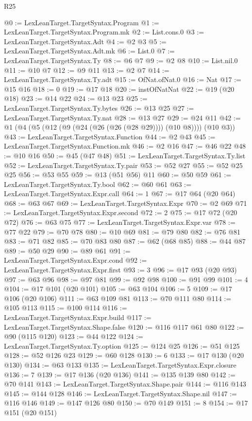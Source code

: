 \begin{lexlean}{R25}
\begin{coremodule}
@0 := LexLeanTarget.TargetSyntax.Program
@1 := LexLeanTarget.TargetSyntax.Program.mk
@2 := List.cons.{0}
@3 := LexLeanTarget.TargetSyntax.Adt
@4 := @2 @3
@5 := LexLeanTarget.TargetSyntax.Adt.mk
@6 := List.{0}
@7 := LexLeanTarget.TargetSyntax.Ty
@8 := @6 @7
@9 := @2 @8
@10 := List.nil.{0}
@11 := @10 @7
@12 := @9 @11
@13 := @2 @7
@14 := LexLeanTarget.TargetSyntax.Ty.adt
@15 := OfNat.ofNat.{0}
@16 := Nat
@17 := @15 @16
@18 := 0
@19 := @17 @18
@20 := instOfNatNat
@22 := @19 (@20 @18)
@23 := @14 @22
@24 := @13 @23
@25 := LexLeanTarget.TargetSyntax.Ty.bytes
@26 := @13 @25
@27 := LexLeanTarget.TargetSyntax.Ty.nat
@28 := @13 @27
@29 := @24 @11
@42 := @1 (@4 (@5 (@12 (@9 (@24 (@26 (@26 (@28 @29)))) (@10 @8)))) (@10 @3))
@43 := LexLeanTarget.TargetSyntax.Function
@44 := @2 @43
@45 := LexLeanTarget.TargetSyntax.Function.mk
@46 := @2 @16
@47 := @46 @22
@48 := @10 @16
@50 := @45 (@47 @48)
@51 := LexLeanTarget.TargetSyntax.Ty.list
@52 := LexLeanTarget.TargetSyntax.Ty.pair
@53 := @52 @27
@55 := @52 @25 @25
@56 := @53 @55
@59 := @13 (@51 @56) @11
@60 := @50 @59
@61 := LexLeanTarget.TargetSyntax.Ty.bool
@62 := @60 @61
@63 := LexLeanTarget.TargetSyntax.Expr.call
@64 := 1
@67 := @17 @64 (@20 @64)
@68 := @63 @67
@69 := LexLeanTarget.TargetSyntax.Expr
@70 := @2 @69
@71 := LexLeanTarget.TargetSyntax.Expr.second
@72 := 2
@75 := @17 @72 (@20 @72)
@76 := @63 @75
@77 := LexLeanTarget.TargetSyntax.Expr.var
@78 := @77 @22
@79 := @70 @78
@80 := @10 @69
@81 := @79 @80
@82 := @76 @81
@83 := @71 @82
@85 := @70 @83 @80
@87 := @62 (@68 @85)
@88 := @44 @87
@89 := @50 @29
@90 := @89 @61
@91 := LexLeanTarget.TargetSyntax.Expr.cond
@92 := LexLeanTarget.TargetSyntax.Expr.first
@93 := 3
@96 := @17 @93 (@20 @93)
@97 := @63 @96
@98 := @97 @81
@99 := @92 @98
@100 := @91 @99
@101 := 4
@104 := @17 @101 (@20 @101)
@105 := @63 @104
@106 := 5
@109 := @17 @106 (@20 @106)
@111 := @63 @109 @81
@113 := @70 @111 @80
@114 := @105 @113
@115 := @100 @114
@116 := LexLeanTarget.TargetSyntax.Expr.build
@117 := LexLeanTarget.TargetSyntax.Shape.false
@120 := @116 @117 @61 @80
@122 := @90 (@115 @120)
@123 := @44 @122
@124 := LexLeanTarget.TargetSyntax.Ty.option
@125 := @124 @25
@126 := @51 @125
@128 := @52 @126 @23
@129 := @60 @128
@130 := 6
@133 := @17 @130 (@20 @130)
@134 := @63 @133
@135 := LexLeanTarget.TargetSyntax.Expr.closure
@136 := 7
@139 := @17 @136 (@20 @136)
@141 := @135 @139 @80
@142 := @70 @141
@143 := LexLeanTarget.TargetSyntax.Shape.pair
@144 := @116 @143
@145 := @144 @128
@146 := LexLeanTarget.TargetSyntax.Shape.nil
@147 := @116 @146
@149 := @147 @126 @80
@150 := @70 @149
@151 := 8
@154 := @17 @151 (@20 @151)

\end{coremodule}
\end{lexlean}
